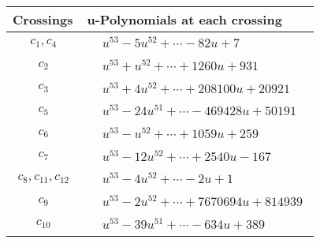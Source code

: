 \documentclass[1p]{elsarticle_modified}
\theoremstyle{definition}
\begin{document}
\begin{tabular}{m{50pt}|m{274pt}}
Crossings & \hspace{64pt}u-Polynomials at each crossing \\
\hline $$\begin{aligned}c_{1},c_{4}\end{aligned}$$&$\begin{aligned}
&u^{53}-5 u^{52}+\cdots-82 u+7
\end{aligned}$\\
\hline $$\begin{aligned}c_{2}\end{aligned}$$&$\begin{aligned}
&u^{53}+u^{52}+\cdots+1260 u+931
\end{aligned}$\\
\hline $$\begin{aligned}c_{3}\end{aligned}$$&$\begin{aligned}
&u^{53}+4 u^{52}+\cdots+208100 u+20921
\end{aligned}$\\
\hline $$\begin{aligned}c_{5}\end{aligned}$$&$\begin{aligned}
&u^{53}-24 u^{51}+\cdots-469428 u+50191
\end{aligned}$\\
\hline $$\begin{aligned}c_{6}\end{aligned}$$&$\begin{aligned}
&u^{53}- u^{52}+\cdots+1059 u+259
\end{aligned}$\\
\hline $$\begin{aligned}c_{7}\end{aligned}$$&$\begin{aligned}
&u^{53}-12 u^{52}+\cdots+2540 u-167
\end{aligned}$\\
\hline $$\begin{aligned}c_{8},c_{11},c_{12}\end{aligned}$$&$\begin{aligned}
&u^{53}-4 u^{52}+\cdots-2 u+1
\end{aligned}$\\
\hline $$\begin{aligned}c_{9}\end{aligned}$$&$\begin{aligned}
&u^{53}-2 u^{52}+\cdots+7670694 u+814939
\end{aligned}$\\
\hline $$\begin{aligned}c_{10}\end{aligned}$$&$\begin{aligned}
&u^{53}-39 u^{51}+\cdots-634 u+389
\end{aligned}$\\
\hline
\end{tabular}\\~\\
\end{document}
